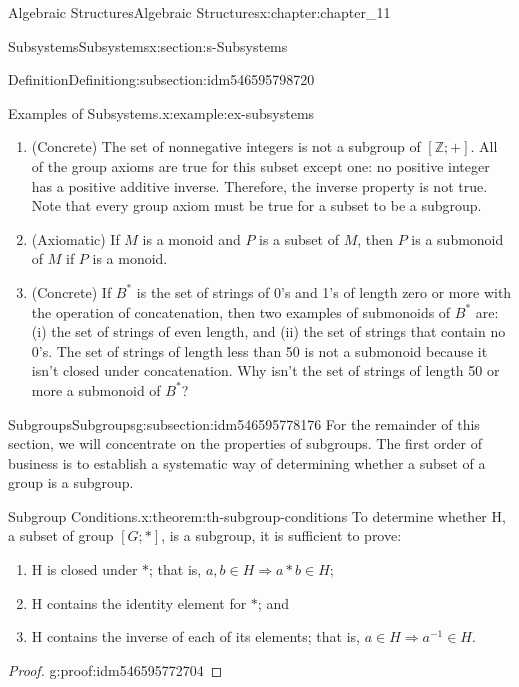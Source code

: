 \documentclass[oneside,10pt,]{book}
\numberwithin{equation}{section}
\begin{document}
\begin{chapterptx}{Algebraic Structures}{}{Algebraic Structures}{}{}{x:chapter:chapter_11}
\begin{sectionptx}{Subsystems}{}{Subsystems}{}{}{x:section:s-Subsystems}
\begin{subsectionptx}{Definition}{}{Definition}{}{}{g:subsection:idm546595798720}
\begin{example}{Examples of Subsystems.}{x:example:ex-subsystems}
\begin{enumerate}[label=(\alph*)]
\item{}(Concrete) The set of nonnegative integers is not a subgroup of \([\mathbb{Z}; +]\). All of the group axioms are true for this subset except one: no positive integer has a positive additive inverse. Therefore, the inverse property is not true. Note that every group axiom must be true for a subset to be a subgroup.%
\item{}(Axiomatic) If \(M\) is a monoid and \(P\) is a subset of \(M\), then \(P\) is a submonoid of \(M\) if \(P\) is a monoid.%
\item{}(Concrete) If \(B^*\) is the set of strings of 0's and 1's of length zero or more with the operation of concatenation, then two examples of submonoids of \(B^*\) are: (i) the set of strings of even length, and (ii) the set of strings that contain no 0's. The set of strings of length less than 50 is not a submonoid because it isn't closed under concatenation. Why isn't the set of strings of length 50 or more a submonoid of \(B^*\)?%
\end{enumerate}
%
\end{example}
\end{subsectionptx}
%
%
\typeout{************************************************}
\typeout{************************************************}
%
\begin{subsectionptx}{Subgroups}{}{Subgroups}{}{}{g:subsection:idm546595778176}
For the remainder of this section, we will concentrate on the properties of subgroups. The first order of business is to establish a systematic way of determining whether a subset of a group is a subgroup.%
\begin{theorem}{Subgroup Conditions.}{}{x:theorem:th-subgroup-conditions}%
To determine whether H, a subset of group \([G;*]\), is a subgroup, it is sufficient to prove:%
\begin{enumerate}[label=(\alph*)]
\item{}H is closed under \(*\); that is, \(a, b \in  H \Rightarrow a * b \in  H\);%
\item{}H contains the identity element for \(*\); and%
\item{}H contains the inverse of each of its elements; that is,  \(a\in  H \Rightarrow a^{-1}\in  H\).%
\end{enumerate}
%
\end{theorem}
\begin{proof}{}{g:proof:idm546595772704}

\end{proof}
\end{subsectionptx}
\end{sectionptx}
\end{chapterptx}
\end{document}
